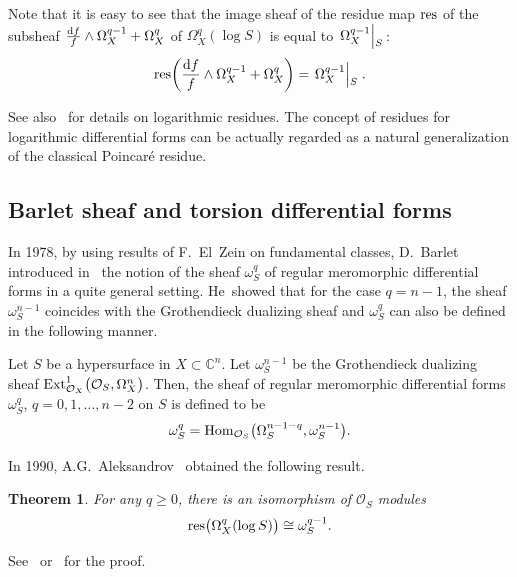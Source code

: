 \documentclass[pdftex]{sigma}%
\numberwithin{equation}{section}
\newtheorem{Theorem}{Theorem}[section]
\begin{document}
Note that it is easy to see that the image sheaf of the residue map $ {\rm res} $ of the subsheaf ${\frac{{\rm d}f}{f}\wedge \Omega_X^{q-1} + \Omega_X^{q}} $ of $ \Omega_X^{q}(\log S)$ is equal to $\left. \Omega_X^{q-1}\middle|\raisebox{-0.7ex}[1ex][-2ex]{{\hspace{-1mm}\;$_S$}}\right.$:
\begin{gather*}
{\rm res}\bigg( \frac{{\rm d}f}{f}\wedge \Omega_X^{q-1} + \Omega_X^{q}\bigg) = \left.\Omega_X^{q-1}\middle|\raisebox{-0.7ex}[1ex][-2ex]{{\hspace{-1mm}\;$_S$}}\right..
\end{gather*}

See also~\cite{S} for details on logarithmic residues.
The concept of residues for logarithmic differential forms can be actually regarded as a natural generalization of the classical Poincar\'e residue.

\subsection{Barlet sheaf and torsion differential forms}

In 1978, by using results of F.~El~Zein on fundamental classes, D.~Barlet introduced in~\cite{B} the notion of the sheaf $\omega_S^{q}$ of regular meromorphic differential forms in a quite general setting. He~showed that for the case $q=n-1$, the sheaf $ \omega_S^{n-1}$ coincides with the
Grothendieck dualizing sheaf and $ \omega_S^{q} $ can also be defined in the following manner.

\begin{Definition}
 Let $S$ be a hypersurface in $X \subset {\mathbb C}^n$. Let $ \omega_S^{n-1} $ be the Grothendieck dua\-li\-zing sheaf $ {\rm Ext}_{{\mathcal O}_X}^{1}\big({\mathcal O}_S, \Omega_X^{n}\big)$. Then, the sheaf of regular meromorphic differential forms $ \omega_S^{q}$, $q=0,1,\dots, n-2$ on $S$ is defined to be
\begin{gather*}
 \omega_S^{q} = {\rm Hom}_{{\mathcal O}_S}\big(\Omega_S^{n-1-q}, \omega_S^{n-1}\big).
\end{gather*}

\end{Definition}



In 1990, A.G.~Aleksandrov~\cite{A} obtained the following result.

{\samepage\begin{Theorem}
 For any $ q \geq 0$, there is an isomorphism of $ {\mathcal O}_S $ modules
\begin{gather*}
{\rm res}\big(\Omega_X^{q}(\log S)\big) \cong \omega_S^{q-1}.
\end{gather*}

\end{Theorem}

See~\cite{A} or~\cite{A05} for the proof.

}
\end{document}
